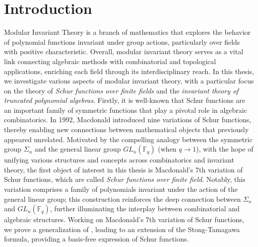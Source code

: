 \documentclass[12pt,a4paper]{report}
\theoremstyle{definition}
\theoremstyle{remark}
\theoremstyle{definition}
\begin{document}
\chapter*{
Introduction
}
Modular Invariant Theory is a branch of mathematics that explores the behavior of polynomial functions invariant under group actions, particularly over fields with positive characteristic. Overall, modular invariant theory serves as a vital link connecting algebraic methods with combinatorial and topological applications, enriching each field through its interdisciplinary reach. In this thesis, we investigate various aspects of modular invariant theory, with a particular focus on the theory of \emph{Schur functions over finite fields} and the \emph{invariant theory of truncated polynomial algebras}.\smallbreak
Firstly, it is well-known that Schur functions are an important family of symmetric functions that play a pivotal role in algebraic combinatorics. In 1992, Macdonald \cite{macdonald_schur_1992} introduced nine variations of Schur functions, thereby enabling new connections between mathematical objects that previously appeared unrelated. Motivated by the compelling analogy between the symmetric group $\Sigma_n$ and the general linear group $GL_n(\mathbb{F}_q)$ (when $q\to 1$), with the hope of unifying various structures and concepts across combinatorics and invariant theory, the first object of interest in this thesis is Macdonald's 7th variation of Schur functions, which are called \emph{Schur functions over finite field}. Notably, this variation comprises a family of polynomials invariant under the action of the general linear group; this construction reinforces the deep connection between $\Sigma_n$ and $GL_n(\mathbb{F}_q)$, further illuminating the interplay between combinatorial and algebraic structures. Working on Macdonald's 7th variation of Schur functions, we prove a generalization of \cite[Conjecture (7.25)]{macdonald_schur_1992}, leading to an extension of the Stong-Tamagawa formula, providing a basis-free expression of Schur functions.\smallbreak
\end{document}
